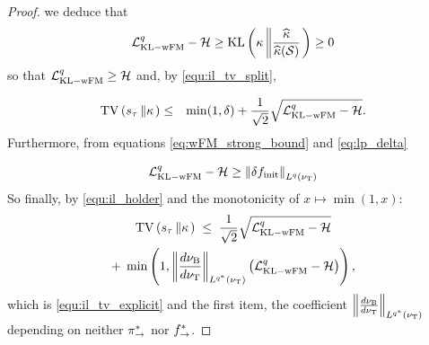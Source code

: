 \begin{proof}
   we deduce that
    \begin{equation}
\mathcal L_{\mathrm{KL-wFM}}^q -\mathcal H \geq \mathrm{KL}\left(\kappa\left\| \frac{\widehat{\kappa}}{\widehat{\kappa}(\mathcal S)}\right. \right) \geq 0
    \end{equation}
    so that
    $ \mathcal L_{\mathrm{KL-wFM}}^q \geq   \mathcal H $ and, by \eqref{equ:il_tv_split},

    \begin{eqnarray}
         \mathrm{TV}\left(s_\tau \left\| \kappa \right.\right) &\leq& \min(1,\delta) +  \frac{1}{\sqrt{2}}\sqrt{ \mathcal L_{\mathrm{KL-wFM}}^q  - \mathcal H}.
    \end{eqnarray}
   Furthermore, from equations \eqref{eq:wFM_strong_bound} and \eqref{eq:lp_delta}

   \begin{equation}
       \mathcal L_{\mathrm{KL-wFM}}^q  -\mathcal H \geq \left\|\delta f_{\mathrm{init}}\right\|_{L^{q}(\nu_{\mathrm{T}})}
   \end{equation}
   So finally, by \eqref{equ:il_holder} and the monotonicity of $x\mapsto\min(1,x)$:
   \begin{multline}
         \mathrm{TV}\left(s_\tau \left\| \kappa \right.\right) \;\leq\; \frac{1}{\sqrt{2}}\sqrt{ \mathcal L_{\mathrm{KL-wFM}}^q  - \mathcal H} \\ +\;\min\left(1,\left\|\frac{d\nu_{\mathrm{B}}}{d\nu_{\mathrm{T}}}\right\|_{L^{q^*}(\nu_{\mathrm{T}})}\left(\mathcal L_{\mathrm{KL-wFM}}^q  - \mathcal H\right)\right),
    \end{multline}
    which is \eqref{equ:il_tv_explicit} and the first item, the coefficient $\left\|\frac{d\nu_{\mathrm{B}}}{d\nu_{\mathrm{T}}}\right\|_{L^{q^*}(\nu_{\mathrm{T}})}$ depending on neither $\pi_{\rightarrow}^*$ nor $f^*_{\rightarrow}$.


\end{proof}
